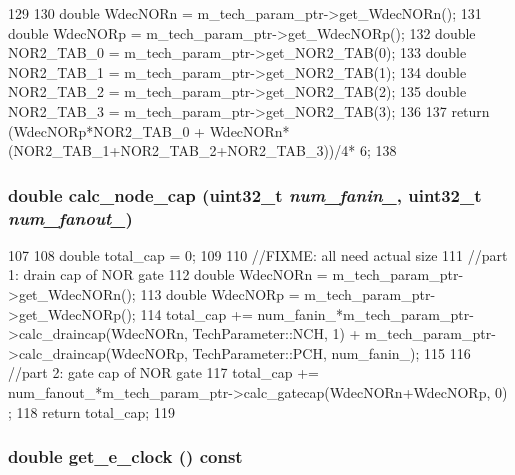 \begin{DoxyCode}
129 {
130     double WdecNORn = m_tech_param_ptr->get_WdecNORn();
131     double WdecNORp = m_tech_param_ptr->get_WdecNORp();
132     double NOR2_TAB_0 = m_tech_param_ptr->get_NOR2_TAB(0);
133     double NOR2_TAB_1 = m_tech_param_ptr->get_NOR2_TAB(1);
134     double NOR2_TAB_2 = m_tech_param_ptr->get_NOR2_TAB(2);
135     double NOR2_TAB_3 = m_tech_param_ptr->get_NOR2_TAB(3);
136 
137     return (WdecNORp*NOR2_TAB_0 + WdecNORn*(NOR2_TAB_1+NOR2_TAB_2+NOR2_TAB_3))/4*
      6;
138 }
\end{DoxyCode}
\hypertarget{classFlipFlop_a8eb4bf711fb28f21b466671a275d84a7}{
\subsubsection[{calc\_\-node\_\-cap}]{\setlength{\rightskip}{0pt plus 5cm}double calc\_\-node\_\-cap ({\bf uint32\_\-t} {\em num\_\-fanin\_\-}, \/  {\bf uint32\_\-t} {\em num\_\-fanout\_\-})}}
\label{classFlipFlop_a8eb4bf711fb28f21b466671a275d84a7}



\begin{DoxyCode}
107 {
108     double total_cap = 0;
109 
110     //FIXME: all need actual size
111     //part 1: drain cap of NOR gate
112     double WdecNORn = m_tech_param_ptr->get_WdecNORn();
113     double WdecNORp = m_tech_param_ptr->get_WdecNORp();
114     total_cap += num_fanin_*m_tech_param_ptr->calc_draincap(WdecNORn, 
      TechParameter::NCH, 1) + m_tech_param_ptr->calc_draincap(WdecNORp, 
      TechParameter::PCH, num_fanin_);
115 
116     //part 2: gate cap of NOR gate
117     total_cap += num_fanout_*m_tech_param_ptr->calc_gatecap(WdecNORn+WdecNORp, 0)
      ;
118     return total_cap;
119 }
\end{DoxyCode}
\hypertarget{classFlipFlop_ab95f28822addf0d46785fbab52bf6d32}{
\subsubsection[{get\_\-e\_\-clock}]{\setlength{\rightskip}{0pt plus 5cm}double get\_\-e\_\-clock () const}}
\label{classFlipFlop_ab95f28822addf0d46785fbab52bf6d32}




